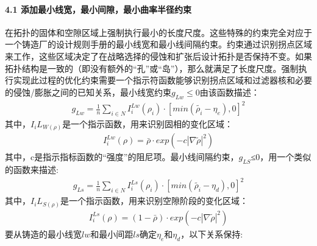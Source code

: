 \documentclass[a4paper,10pt,english]{sphinxmanual}
\begin{document}
\paragraph{4.1 添加最小线宽，最小间隙，最小曲率半径约束}
\label{\detokenize{_u7b80_u4ecb/_u6838_u5fc3_u8bbe_u8ba1_u4f18_u5316_u7b97_u6cd5/_u68af_u5ea6_u62d3_u6251_u4f18_u5316_u6a21_u5757/_u68af_u5ea6_u62d3_u6251_u4f18_u5316_u7b97_u6cd5:id15}}
\sphinxAtStartPar
在拓扑的固体和空隙区域上强制执行最小的长度尺度。这些特殊的约束完全对应于一个铸造厂的设计规则手册的最小线宽和最小线间隔约束。约束通过识别拐点区域来工作，这些区域决定了在战略选择的侵蚀和扩张后设计拓扑是否保持不变。如果拓扑结构是一致的（即没有额外的“孔”或“岛”），那么就满足了长度尺度。强制执行实现此过程的优化约束需要一个指示符函数能够识别拐点区域和过滤器核和必要的侵蚀/膨胀之间的已知关系，最小线宽约束\(g_{Lw}≤0\)由该函数描述：
\begin{equation*}
\begin{split}g_{Lw}=\frac{1}{n}\sum_{i∈N} I_i^{Lw}(ρ_i)·[min{(\tilde{\rho_i}-η_e),0}]^2\end{split}
\end{equation*}
\sphinxAtStartPar
其中，\(I_{i}L_{W(ρ)}\)是一个指示函数，用来识别固相的变化区域：
\begin{equation*}
\begin{split}I_i^{Lw}(\rho)=\bar{\rho}·exp(-c\left| \nabla{\tilde{\rho}} \right|^2)\end{split}
\end{equation*}
\sphinxAtStartPar
其中，c是指示指标函数的“强度”的阻尼项。最小线间隔约束，\(g_{LS}\)≤0，用一个类似的函数来描述:
\begin{equation*}
\begin{split}g_{Ls}=\frac{1}{n}\sum_{i∈N} I_i^{Ls}(ρ_i)·[min{(\tilde{\rho_i}-η_d),0}]^2\end{split}
\end{equation*}
\sphinxAtStartPar
其中，\(I_{i}L_{S(ρ)}\)是一个指示函数，用来识别空隙阶段的变化区域：
\begin{equation*}
\begin{split}I_i^{Ls}(\rho)=(1-\bar{\rho})·exp(-c\left| \nabla{\tilde{\rho}} \right|^2)\end{split}
\end{equation*}
\sphinxAtStartPar
要从铸造的最小线宽\(lw\)和最小间距\(ls\)确定\(η_{e}\)和\(η_{d}\)，以下关系保持:
\end{document}

